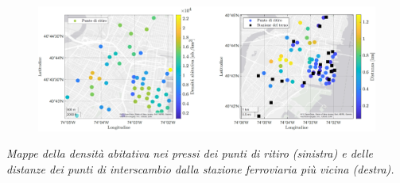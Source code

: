 \begin{frame}
	\centering
			\begin{figure}
				\includegraphics[width=\textwidth]{../Tesi/Immagini/4. Caso di studio/Mappe/Mappa punti ritiro e stazioni treno e densita ab AGGREGATA}
			\end{figure}
	\textit{Mappe della densità abitativa nei pressi dei punti di ritiro (sinistra) e delle distanze dei punti di interscambio dalla stazione ferroviaria più vicina (destra).}
\end{frame}

